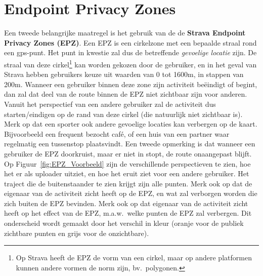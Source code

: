 \section{Endpoint Privacy Zones}\label{EPZ}
Een tweede belangrijke maatregel is het gebruik van de de \textbf{Strava
    Endpoint Privacy Zones (EPZ)}. Een EPZ is een cirkelzone met een bepaalde
straal rond een gps-punt. Het punt in kwestie zal dus de betreffende
\textit{gevoelige locatie} zijn. De straal van deze cirkel\footnote{Op Strava
    heeft de EPZ de vorm van een cirkel, maar op andere platformen kunnen andere
    vormen de norm zijn, bv.\ polygonen.} kan worden gekozen door de gebruiker, en
in het geval van Strava hebben gebruikers keuze uit waarden van 0 tot 1600m, in
stappen van 200m. Wanneer een gebruiker binnen deze zone zijn activiteit
beëindigt of begint, dan zal dat deel van de route binnen de EPZ niet zichtbaar
zijn voor anderen. Vanuit het perspectief van een andere gebruiker zal de
activiteit dus starten/eindigen op de rand van deze cirkel (die natuurlijk niet
zichtbaar is). Merk op dat een sporter ook andere gevoelige locaties kan
verbergen op de kaart. Bijvoorbeeld een frequent bezocht café, of een huis van
een partner waar regelmatig een tussenstop plaatsvindt. Een tweede opmerking is
dat wanneer een gebruiker de EPZ doorkruist, maar er niet in stopt, de route
onaangepast blijft. Op Figuur~\ref{fig:EPZ_Voorbeeld} zijn de verschillende
perspectieven te zien, hoe het er als uploader uitziet, en hoe het eruit ziet
voor een andere gebruiker. Het traject die de buitenstaander te zien krijgt
zijn alle punten. Merk ook op dat de eigenaar van de activiteit zicht heeft op
de EPZ, en wat zal verborgen worden die zich buiten de EPZ bevinden. Merk ook
op dat eigenaar van de activiteit zicht heeft op het effect van de EPZ, m.a.w.\
welke punten de EPZ zal verbergen. Dit onderscheid wordt gemaakt door het
verschil in kleur (oranje voor de publiek zichtbare punten en grijs voor de
onzichtbare).
